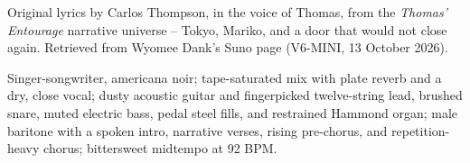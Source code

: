 
\label{sec:after-the-door-was-open}
\begin{notes}
Original lyrics by Carlos Thompson, in the voice of Thomas, from the \emph{Thomas' Entourage} narrative universe -- Tokyo, Mariko, and a door that would not close again. Retrieved from Wyomee Dank's Suno page (V6-MINI, 13 October 2026).
\end{notes}
\begin{style}
Singer-songwriter, americana noir; tape-saturated mix with plate reverb and a dry, close vocal; dusty acoustic guitar and fingerpicked twelve-string lead, brushed snare, muted electric bass, pedal steel fills, and restrained Hammond organ; male baritone with a spoken intro, narrative verses, rising pre-chorus, and repetition-heavy chorus; bittersweet midtempo at 92 BPM.
\end{style}
